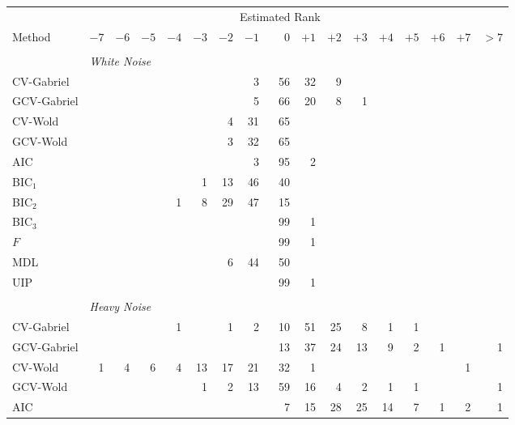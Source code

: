 \clearpage 

\begin{table}
    \tiny
    \begin{tabular}{lrrrrrrrrrrrrrrrr}
        \toprule
        &\multicolumn{15}{c}{\scriptsize{Estimated Rank}} \\
        \cmidrule{2-17}
        \scriptsize{Method}
            & $-7$ & $-6$ & $-5$ & $-4$ & $-3$ & $-2$ & $-1$ 
            & $\phantom{+}0$ 
            & $+1$ & $+2$ & $+3$ & $+4$ & $+5$ & $+6$ & $+7$ & $> 7$ \\
        \midrule
        \\
        &\multicolumn{16}{l}{\scriptsize{\textit{White Noise}}} \\
 CV-Gabriel &  &  &  &  &  &  &  3 &  56 &  32 &  9 &  &  &  &  &  & \\ 
 GCV-Gabriel &  &  &  &  &  &  &  5 &  66 &  20 &  8 &  1 &  &  &  &  & \\ 
 CV-Wold &  &  &  &  &  &  4 &  31 &  65 &  &  &  &  &  &  &  & \\ 
 GCV-Wold &  &  &  &  &  &  3 &  32 &  65 &  &  &  &  &  &  &  & \\ 
 AIC &  &  &  &  &  &  &  3 &  95 &  2 &  &  &  &  &  &  & \\ 
 BIC$_1$ &  &  &  &  &  1 &  13 &  46 &  40 &  &  &  &  &  &  &  & \\ 
 BIC$_2$ &  &  &  &  1 &  8 &  29 &  47 &  15 &  &  &  &  &  &  &  & \\ 
 BIC$_3$ &  &  &  &  &  &  &  &  99 &  1 &  &  &  &  &  &  & \\ 
 $F$ &  &  &  &  &  &  &  &  99 &  1 &  &  &  &  &  &  & \\ 
 MDL &  &  &  &  &  &  6 &  44 &  50 &  &  &  &  &  &  &  & \\ 
 UIP &  &  &  &  &  &  &  &  99 &  1 &  &  &  &  &  &  & \\ 
        \\
        &\multicolumn{16}{l}{\scriptsize{\textit{Heavy Noise}}} \\
CV-Gabriel &  &  &  &  1 &  &  1 &  2 &  10 &  51 &  25 &  8 &  1 &  1 &  &  & \\ 
 GCV-Gabriel &  &  &  &  &  &  &  &  13 &  37 &  24 &  13 &  9 &  2 &  1 &  &  1\\ 
 CV-Wold &  1 &  4 &  6 &  4 &  13 &  17 &  21 &  32 &  1 &  &  &  &  &  &  1 & \\ 
 GCV-Wold &  &  &  &  &  1 &  2 &  13 &  59 &  16 &  4 &  2 &  1 &  1 &  &  &  1\\ 
 AIC &  &  &  &  &  &  &  &  7 &  15 &  28 &  25 &  14 &  7 &  1 &  2 &  1\\ 

\end{tabular}
\end{table}
